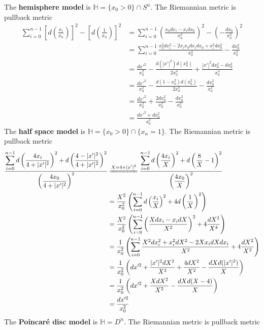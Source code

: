 \documentclass[main]{subfiles}
\begin{document}
\begin{definition}
The \textbf{hemisphere model} is $\mathbb H=\{x_0>0\}\cap S^{n}$. The Riemannian metric is pullback metric
\begin{align*}
\sum_{i=0}^{n-1}\left[d\left(\frac{x_i}{x_n}\right)\right]^2-\left[d\left(\frac{1}{x_n}\right)\right]^2
&=\sum_{i=0}^{n-1}\left(\frac{x_0dx_i-x_idx_0}{x_0^2}\right)^2-\left(-\frac{dx_0}{x_0^2}\right)^2 \\
&=\sum_{i=0}^{n-1}\frac{x_0^2dx_i^2-2x_ix_0dx_idx_0+x_i^2dx_0^2}{x_0^4}-\frac{dx_0^2}{x_0^4} \\
&=\frac{dx'^2}{x_0^2}-\frac{d(|x'|^2)d(x_0^2)}{2x_0^4}+\frac{|x'|^2dx_0^2-dx_0^2}{x_0^4} \\
&=\frac{dx'^2}{x_0^2}-\frac{d(1-x_0^2)d(x_0^2)}{2x_0^4}-\frac{dx_0^2}{x_0^2} \\
&=\frac{dx'^2}{x_0^2}+\frac{2dx_0^2}{x_0^2}-\frac{dx_0^2}{x_0^2} \\
&=\frac{dx'^2+dx_0^2}{x_0^2}
\end{align*}
The \textbf{half space model} is $\mathbb H=\{x_0>0\}\cap\{x_n=1\}$. The Riemannian metric is pullback metric
\begin{align*}
\frac{\displaystyle\sum_{i=0}^{n-1}d\left(\dfrac{4x_i}{4+|x'|^2}\right)^2+d\left(\dfrac{4-|x'|^2}{4+|x'|^2}\right)^2}{\left(\dfrac{4x_0}{4+|x'|^2}\right)^2}
&\xequal{X=4+|x'|^2}
\frac{\displaystyle\sum_{i=0}^{n-1}d\left(\dfrac{4x_i}{X}\right)^2+d\left(\dfrac{8}{X}-1\right)^2}{\left(\dfrac{4x_0}{X}\right)^2} \\
&=\frac{X^2}{x_0^2}\left(\displaystyle\sum_{i=0}^{n-1}d\left(\dfrac{x_i}{X}\right)^2+4d\left(\dfrac{1}{X}\right)^2\right) \\
&=\frac{X^2}{x_0^2}\left(\displaystyle\sum_{i=0}^{n-1}\left(\dfrac{Xdx_i-x_idX}{X^2}\right)^2+4\dfrac{dX^2}{X^4}\right) \\
&=\frac{1}{x_0^2}\left(\displaystyle\sum_{i=0}^{n-1}\dfrac{X^2dx_i^2+x_i^2dX^2-2Xx_idXdx_i}{X^2}+4\dfrac{dX^2}{X^2}\right) \\
&=\frac{1}{x_0^2}\left(dx'^2+\dfrac{|x'|^2dX^2}{X^2}+\dfrac{4dX^2}{X^2}-\dfrac{dXd(|x'|^2)}{X}\right) \\
&=\frac{1}{x_0^2}\left(dx'^2+\dfrac{XdX^2}{X^2}-\dfrac{dXd(X-4)}{X}\right) \\
&=\frac{dx'^2}{x_0^2} \\
\end{align*}
The \textbf{Poincar\'e disc model} is $\mathbb H=D^n$. The Riemannian metric is pullback metric
\begin{align*}

\end{align*}
\end{definition}
\end{document}

